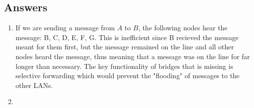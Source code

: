 \documentclass[10pt]{article}
\begin{document}
\newpage

\subsection*{Answers}
    \begin{enumerate}
       \item If we are sending a message from $A$ to $B$, the following nodes hear the message: B, C, D, E, F, G. This is inefficient since B recieved the message meant for them first, but the message remained on the line and all other nodes heard the message, thus meaning that a message was on the line for far longer than necessary. The key functionality of bridges that is missing is selective forwarding which would prevent the "flooding" of messages to the other LANs.
       \item 
    \end{enumerate}
\end{document}
